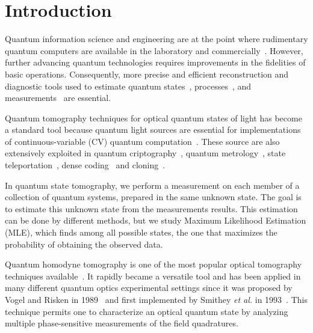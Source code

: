 \documentclass[
reprint,
superscriptaddress,
showpacs,
amsmath,
amssymb,
aps,
pra,
longbibliography
]{revtex4-1}
\begin{document}
\section{Introduction}
\label{intro}
Quantum information science and engineering are at
the point where rudimentary quantum computers are available in the
laboratory and
commercially~\cite{kandala2017,Linke2017,Monk2017,Denchev2016}.
However, further advancing quantum technologies requires
  improvements in the fidelities of basic operations.  Consequently,
more precise and efficient reconstruction and diagnostic
tools used to estimate quantum states~\cite{Vogel1989, Smithey1993,
  Dunn1995, Banaszek1999, Banaszek2000, White2002, Ourjoumtsev2007,
  Neergaard2006}, processes~\cite{Chuang1997, Poyatos1997,
  Altepeter2003, Dariano1998, Nielsen1998, Mitchell2003,
  Obrien2004,Kupchak2015}, and measurements~\cite{Luis1999,
  Fiurasek2001, Dariano2004, Lundeen2009} are
essential.

Quantum tomography techniques for optical quantum states of
  light has become a standard tool because quantum
light sources are essential for implementations of continuous-variable
(CV) quantum computation~\cite{Lloyd1999, Gottesman2001, Bartlett2002,
  Jeong2002, Ralph2003}.  These source are also extensively exploited
in quantum criptography~\cite{Ralph1999, Hillery2000, Silberhorn2002,
  Pirandola2008, Luiz2017}, quantum metrology~\cite{Eberle2010,
  Demkowicz2013}, state teleportation~\cite{Vaidman1994,
  Braunstein1998, He2015}, dense coding~\cite{Braunstein2000, Lee2014}
and cloning~\cite{Cerf2000, Braunstein2001}.

In quantum state tomography, we perform a measurement on each member of
a collection of quantum systems, prepared in
the same unknown state. The goal is to estimate this
unknown state from the measurements
results. This estimation can be done by different methods, but we study 
Maximum Likelihood Estimation (MLE), which finds among all possible states, the one
that maximizes the probability of obtaining the observed data.

Quantum homodyne tomography is one of the most popular optical
tomography techniques available~\cite{Lvovsky2004}. It rapidly
became a versatile tool and has been applied in many different quantum
optics experimental settings since it was proposed by Vogel and Risken
in 1989~\cite{Vogel1989} and first implemented by Smithey \textit{et
  al.}  in 1993~\cite{Smithey1993}. This technique permits one to
characterize an optical quantum state by analyzing multiple
  phase-sensitive measurements of the field quadratures. 
\end{document}
